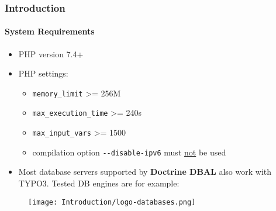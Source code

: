 %

\begin{frame}[fragile]
	\frametitle{Introduction}
	\framesubtitle{System Requirements}

	\begin{itemize}
		\item PHP version 7.4+
		\item PHP settings:

			\begin{itemize}
				\item \texttt{memory\_limit} >= 256M
				\item \texttt{max\_execution\_time} >= 240s
				\item \texttt{max\_input\_vars} >= 1500
				\item compilation option \texttt{-}\texttt{-disable-ipv6} must \underline{not} be used
			\end{itemize}

		\item Most database servers supported by \textbf{Doctrine DBAL} also work with TYPO3.
			Tested DB engines are for example:
	\end{itemize}

	\begin{figure}
		\texttt{[image: Introduction/logo-databases.png]}
	\end{figure}

\end{frame}

